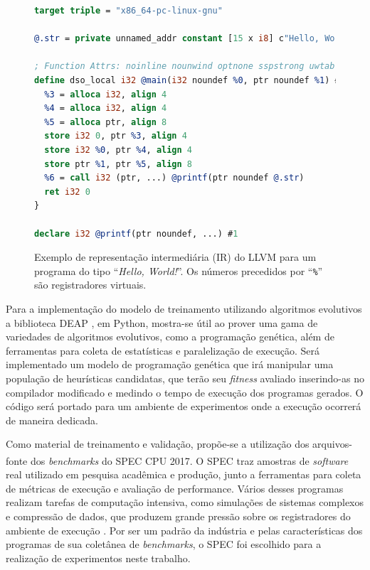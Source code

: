 \documentclass[
	12pt,				%
	openright,			%
	twoside,			%
	a4paper,			%
	tcc,			%
	]{ABNT-DC-UEL}
\begin{document}
\begin{figure}[ht]
    \centering
    \begin{lstlisting}[language=llvm, frame=single]
target triple = "x86_64-pc-linux-gnu"

@.str = private unnamed_addr constant [15 x i8] c"Hello, World!\0A\00", align 1

; Function Attrs: noinline nounwind optnone sspstrong uwtable
define dso_local i32 @main(i32 noundef %0, ptr noundef %1) #0 {
  %3 = alloca i32, align 4
  %4 = alloca i32, align 4
  %5 = alloca ptr, align 8
  store i32 0, ptr %3, align 4
  store i32 %0, ptr %4, align 4
  store ptr %1, ptr %5, align 8
  %6 = call i32 (ptr, ...) @printf(ptr noundef @.str)
  ret i32 0
}

declare i32 @printf(ptr noundef, ...) #1
    \end{lstlisting}
    \caption{Exemplo de representação intermediária (IR) do LLVM para um programa do tipo ``\textit{Hello, World!}''. Os números precedidos por ``\texttt{\%}'' são registradores virtuais.}
    \label{fig:llvm-exemplo}
\end{figure}

Para a implementação do modelo de treinamento utilizando algoritmos evolutivos a biblioteca DEAP \cite{fortin:12}, em Python, mostra-se útil ao prover uma gama de variedades de algoritmos evolutivos, como a programação genética, além de ferramentas para coleta de estatísticas e paralelização de execução. Será implementado um modelo de programação genética que irá manipular uma população de heurísticas candidatas, que terão seu \textit{fitness} avaliado inserindo-as no compilador modificado e medindo o tempo de execução dos programas gerados. O código será portado para um ambiente de experimentos onde a execução ocorrerá de maneira dedicada.

Como material de treinamento e validação, propõe-se a utilização dos arquivos-fonte dos \textit{benchmarks} do SPEC CPU\textsuperscript{\textregistered} 2017. 
O SPEC traz amostras de \textit{software} real utilizado em pesquisa acadêmica e produção, junto a ferramentas para coleta de métricas de execução e avaliação de performance. Vários desses programas realizam tarefas de computação intensiva, como simulações de sistemas complexos e compressão de dados, que produzem grande pressão sobre os registradores do ambiente de execução \cite{speccpu:01}. 
Por ser um padrão da indústria e pelas características dos programas de sua coletânea de \textit{benchmarks}, o SPEC foi escolhido para a realização de experimentos neste trabalho.
\end{document}
